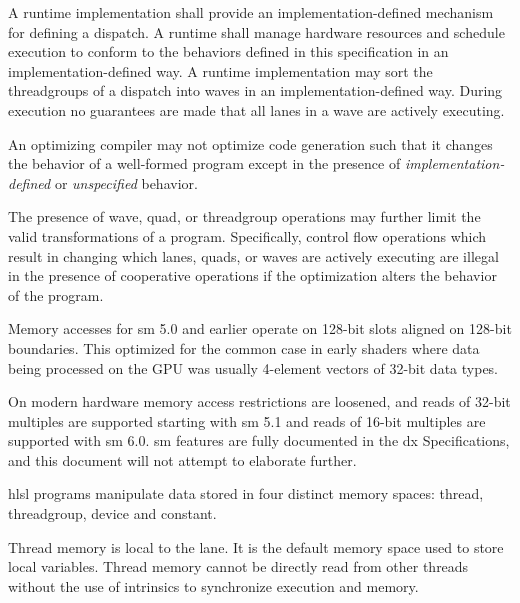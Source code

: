
\p A runtime implementation shall provide an implementation-defined mechanism
for defining a \gls{dispatch}. A runtime shall manage hardware resources and
schedule execution to conform to the behaviors defined in this specification in
an implementation-defined way. A runtime implementation may sort the
\gls{threadgroup}s of a \gls{dispatch} into \gls{wave}s in an
implementation-defined way. During execution no guarantees are made that all
\gls{lane}s in a \gls{wave} are actively executing.


\p An optimizing compiler may not optimize code generation such that it changes
the behavior of a well-formed program except in the presence of
\textit{implementation-defined} or \textit{unspecified} behavior.

\p The presence of \gls{wave}, \gls{quad}, or \gls{threadgroup} operations
may further limit the valid transformations of a program. Specifically, control
flow operations which result in changing which \gls{lane}s, \gls{quad}s, or
\gls{wave}s are actively executing are illegal in the presence of cooperative
operations if the optimization alters the behavior of the program.


\p Memory accesses for \gls{sm} 5.0 and earlier operate on 128-bit slots aligned
on 128-bit boundaries. This optimized for the common case in early shaders where
data being processed on the GPU was usually 4-element vectors of 32-bit data
types.

\p On modern hardware memory access restrictions are loosened, and reads of
32-bit multiples are supported starting with \gls{sm} 5.1 and reads of 16-bit
multiples are supported with \gls{sm} 6.0. \gls{sm} features are fully
documented in the \gls{dx} Specifications, and this document will not attempt to
elaborate further.


\p \acrshort{hlsl} programs manipulate data stored in four distinct memory
spaces: thread, threadgroup, device and constant.


\p Thread memory is local to the \gls{lane}. It is the default memory space used to
store local variables. Thread memory cannot be directly read from other threads
without the use of intrinsics to synchronize execution and memory.

